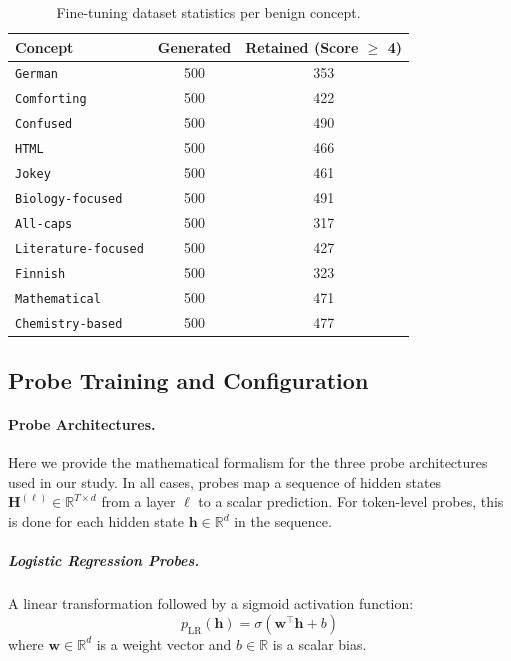 \documentclass{article} %
\begin{document}
\begin{table}[hbtp]
\centering
\caption{Fine-tuning dataset statistics per benign concept.}
\label{tab:dataset_stats}
\begin{tabular}{lcc}
\toprule
\textbf{Concept} & \textbf{Generated} & \textbf{Retained (Score $\ge$ 4)} \\
\midrule
\texttt{German} & 500 & 353 \\
\texttt{Comforting} & 500 & 422 \\
\texttt{Confused} & 500 & 490 \\
\texttt{HTML} & 500 & 466 \\
\texttt{Jokey} & 500 & 461 \\
\texttt{Biology-focused} & 500 & 491 \\
\texttt{All-caps} & 500 & 317 \\
\texttt{Literature-focused} & 500 & 427 \\
\texttt{Finnish} & 500 & 323 \\
\texttt{Mathematical} & 500 & 471 \\
\texttt{Chemistry-based} & 500 & 477 \\
\bottomrule
\end{tabular}
\end{table}


\subsection{Probe Training and Configuration}
\label{app:probe_details}

\paragraph{Probe Architectures.}
Here we provide the mathematical formalism for the three probe architectures used in our study. In all cases, probes map a sequence of hidden states $\mathbf{H}^{(\ell)} \in \mathbb{R}^{T \times d}$ from a layer $\ell$ to a scalar prediction. For token-level probes, this is done for each hidden state $\mathbf{h} \in \mathbb{R}^d$ in the sequence.

\subparagraph{Logistic Regression Probes.} A linear transformation followed by a sigmoid activation function:
\begin{equation}
p_{\text{LR}}(\mathbf{h}) = \sigma(\mathbf{w}^\top \mathbf{h} + b)
\end{equation}
where $\mathbf{w} \in \mathbb{R}^d$ is a weight vector and $b \in \mathbb{R}$ is a scalar bias.
\end{document}
